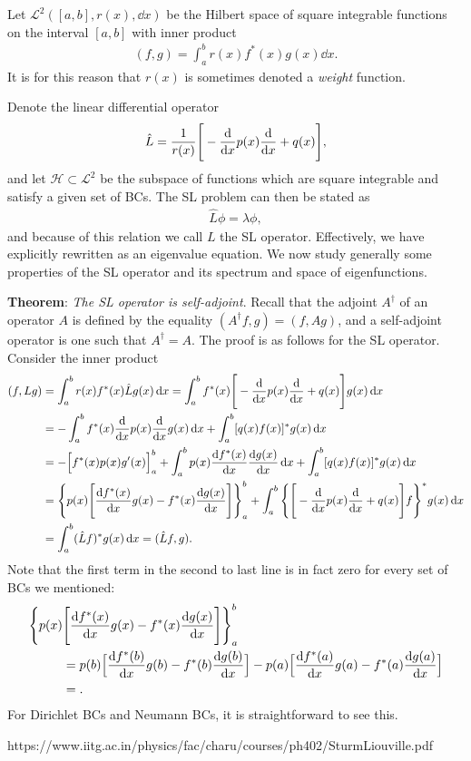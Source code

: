 Let $\mathcal{L}^2([a,b],r(x),\dd{x})$ be the Hilbert space of square integrable functions on the interval $[a,b]$ with inner product
\begin{eqnarray}
    (f,g) = \int_{a}^{b} r(x) f^{*}(x) g(x) \dd{x}
.\end{eqnarray}
It is for this reason that $r(x)$ is sometimes denoted a \textit{weight} function.

Denote the linear differential operator
\begin{eqnarray}
    \label{eq:SL-lin-op}
    \hat{L} = \frac{1}{r(x)} \Bigg[ - \dv{x} p(x) \dv{x} + q(x) \Bigg]
,\end{eqnarray}
and let $\mathcal{H} \subset \mathcal{L}^2$ be the subspace of functions which are square integrable and satisfy a given set of BCs.
The SL problem can then be stated as 
\begin{eqnarray}
    \hat{L} \phi = \lambda \phi
,\end{eqnarray}
and because of this relation we call $L$ the SL operator.
Effectively, we have explicitly rewritten  as an eigenvalue equation.
We now study generally some properties of the SL operator and its spectrum and space of eigenfunctions.

\textbf{Theorem}: \textit{The SL operator is self-adjoint}. Recall that the adjoint $A^{\dagger}$ of an operator $A$ is defined by the equality $(A^{\dagger}f, g) = (f,Ag)$, and a self-adjoint operator is one such that $A^{\dagger} = A$.
The proof is as follows for the SL operator.
Consider the inner product
\begin{align}
    (f,Lg) &= \int_{a}^{b} r(x) f^{*}(x) \hat{L} g(x) \dd{x} = \int_{a}^{b} f^{*}(x) \Bigg[ - \dv{x} p(x) \dv{x} + q(x) \Bigg] g(x) \dd{x} \nonumber \\
    &= -\int_{a}^{b} f^{*}(x) \dv{x} p(x) \dv{x} g(x) \dd{x} + \int_{a}^{b} [ q(x) f(x) ]^{*} g(x) \dd{x} \nonumber \\
    &= -\Big[ f^{*}(x) p(x) g'(x) \Big]_{a}^{b} + \int_{a}^{b} p(x) \dv{f^{*}(x)}{x} \dv{g(x)}{x} \dd{x} + \int_{a}^{b} [ q(x)f(x) ]^{*} g(x) \dd{x} \nonumber \\
    &= \Bigg\{ p(x) \Bigg[ \dv{f^{*}(x)}{x} g(x) - f^{*}(x) \dv{g(x)}{x} \Bigg] \Bigg\}_{a}^{b} + \int_{a}^{b} \Bigg\{ \Bigg[ -\dv{x} p(x) \dv{x} + q(x) \Bigg] f \Bigg\}^{*} g(x) \dd{x} \nonumber \\
    &= \int_{a}^{b} ( \hat{L} f )^{*} g(x) \dd{x} = ( \hat{L} f,g )
.\end{align}
Note that the first term in the second to last line is in fact zero for every set of BCs we mentioned:
\begin{align}
    \Bigg\{ p(x) &\Bigg[ \dv{f^{*}(x)}{x} g(x) - f^{*}(x) \dv{g(x)}{x} \Bigg] \Bigg\}_{a}^{b} \nonumber \\
    &= p(b) \Big[ \dv{f^{*}(b)}{x}g(b) - f^{*}(b) \dv{g(b)}{x} \Big] - p(a) \Big[ \dv{f^{*}(a)}{x}g(a) - f^{*}(a) \dv{g(a)}{x} \Big] \\
    &= 
.\end{align}
For Dirichlet BCs and Neumann BCs, it is straightforward to see this.

https://www.iitg.ac.in/physics/fac/charu/courses/ph402/SturmLiouville.pdf




